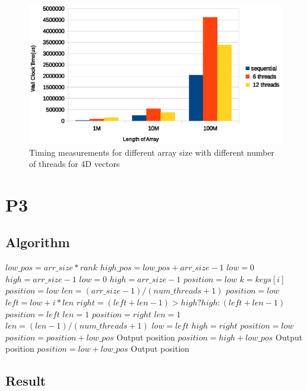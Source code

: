 \documentclass{article}
\begin{document}
\begin{figure}[!htb]
  \centering
  \includegraphics[width=\textwidth]{fig/4D_p2}
  \caption{Timing measurements for different array size with different
    number of threads for 4D vectors}
  \label{fig:4D_p2}
\end{figure}

\FloatBarrier
\section{P3}
\subsection{Algorithm}
\begin{algorithmic}[1]
 \label{alg:p3}
\State $low\_pos = arr\_size * rank$
\State $high\_pos = low\_pos + arr\_size - 1$
\State $low = 0$
\State $high = arr\_size - 1$
\State $low = 0$
\State $high = arr\_size - 1$
\State $position=low$
\State $k = keys[i]$
\State $position = low$
\EndIf
\EndParFor
\Else
\State $len = (arr\_size - 1)/(num\_threads + 1)$
\State $position = low$
\State $left = low + i * len$
\State $right = (left + len - 1) > high ? high : (left + len - 1)$
\State $position=left$
\State $len = 1$
\State $position=right$
\State $len=1$
\Else
{}
\State $len=(len-1)/(num\_threads + 1)$
\State $low = left$
\State $high = right$
\State $position = low$
\EndIf
\EndIf
\EndParFor
\EndWhile
\EndIf
\State $position=position+low\_pos$
\State Output position
\State $position = high + low\_pos$
\State Output position
\Else
{}
\State $position = low + low\_pos$
\State Output position
\EndIf
\EndIf
\EndFor
\EndFunction
\end{algorithmic}
\subsection{Result}
\end{document}
